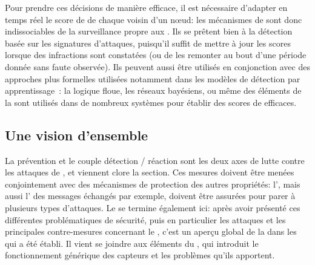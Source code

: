 Pour prendre ces décisions de manière efficace, il est nécessaire d'adapter en temps réel le score de \reput de chaque voisin d'un nœud: les mécanismes de  sont donc indissociables de la surveillance propre aux \IDS.
Ils se prêtent bien à la détection basée sur les signatures d'attaques, puisqu'il suffit de mettre à jour les scores lorsque des infractions sont constatées (ou de les remonter au bout d'une période donnée sans faute observée).
Ils peuvent aussi être utilisés en conjonction avec des approches plus formelles utilisées notamment dans les modèles de détection par apprentissage~\cite{F-GRL07,MC10}: la logique floue, les réseaux bayésiens, ou même des éléments de la  sont utilisés dans de nombreux systèmes pour établir des scores de  efficaces.

\subsection{Une vision d'ensemble}
La prévention et le couple détection / réaction sont les deux axes de lutte contre les attaques de \dds, et viennent clore la section.
Ces mesures doivent être menées conjointement avec des mécanismes de protection des autres propriétés: l', mais aussi l' des messages échangés par exemple, doivent être assurées pour parer à plusieurs types d'attaques.
Le  se termine également ici: après avoir présenté ces différentes problématiques de sécurité, puis en particulier les attaques et les principales contre-mesures concernant le \dds, c'est un aperçu global de la \secu dans les \rcs qui a été établi.
Il vient se joindre aux éléments du , qui introduit le fonctionnement générique des capteurs et les problèmes qu'ils apportent.

